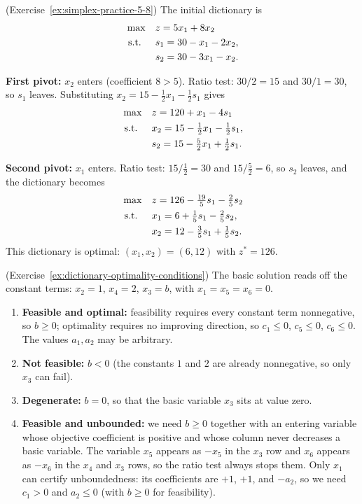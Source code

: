 \begin{solution}(Exercise~\ref{ex:simplex-practice-5-8})
The initial dictionary is
\[
\begin{aligned}
\max\quad & z = 5x_1 + 8x_2 \\
\text{ s.t. }\quad & s_1 = 30 - x_1 - 2x_2, \\
         & s_2 = 30 - 3x_1 - x_2.
\end{aligned}
\]

\textbf{First pivot:} $x_2$ enters (coefficient $8 > 5$).  Ratio test: $30/2 = 15$ and $30/1 = 30$, so $s_1$ leaves.  Substituting $x_2 = 15 - \tfrac12 x_1 - \tfrac12 s_1$ gives
\[
\begin{aligned}
\max\quad & z = 120 + x_1 - 4s_1 \\
\text{ s.t. }\quad & x_2 = 15 - \tfrac12 x_1 - \tfrac12 s_1, \\
         & s_2 = 15 - \tfrac52 x_1 + \tfrac12 s_1.
\end{aligned}
\]

\textbf{Second pivot:} $x_1$ enters.  Ratio test: $15/\tfrac12 = 30$ and $15/\tfrac52 = 6$, so $s_2$ leaves, and the dictionary becomes
\[
\begin{aligned}
\max\quad & z = 126 - \tfrac{19}{5} s_1 - \tfrac{2}{5} s_2 \\
\text{ s.t. }\quad & x_1 = 6 + \tfrac15 s_1 - \tfrac25 s_2, \\
         & x_2 = 12 - \tfrac35 s_1 + \tfrac15 s_2.
\end{aligned}
\]
This dictionary is optimal: $(x_1, x_2) = (6, 12)$ with $z^* = 126$.
\end{solution}
\vspace{1cm}

\begin{solution}(Exercise~\ref{ex:dictionary-optimality-conditions})
The basic solution reads off the constant terms: $x_2 = 1$, $x_4 = 2$, $x_3 = b$, with $x_1 = x_5 = x_6 = 0$.

\begin{enumerate}
\item \textbf{Feasible and optimal:} feasibility requires every constant term nonnegative, so $b \geq 0$; optimality requires no improving direction, so $c_1 \leq 0$, $c_5 \leq 0$, $c_6 \leq 0$.  The values $a_1, a_2$ may be arbitrary.
\item \textbf{Not feasible:} $b < 0$ (the constants $1$ and $2$ are already nonnegative, so only $x_3$ can fail).
\item \textbf{Degenerate:} $b = 0$, so that the basic variable $x_3$ sits at value zero.
\item \textbf{Feasible and unbounded:} we need $b \geq 0$ together with an entering variable whose objective coefficient is positive and whose column never decreases a basic variable.  The variable $x_5$ appears as $-x_5$ in the $x_3$ row and $x_6$ appears as $-x_6$ in the $x_4$ and $x_3$ rows, so the ratio test always stops them.  Only $x_1$ can certify unboundedness: its coefficients are $+1$, $+1$, and $-a_2$, so we need $c_1 > 0$ and $a_2 \leq 0$ (with $b \geq 0$ for feasibility).
\end{enumerate}
\end{solution}
\vspace{1cm}

